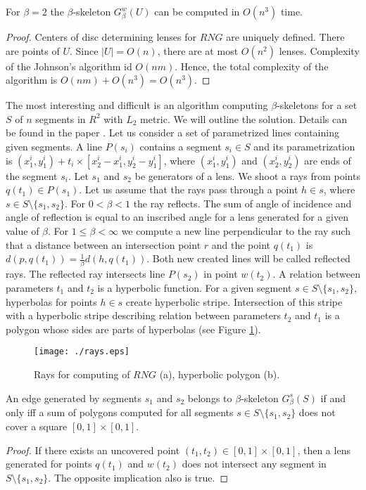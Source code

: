 \documentclass[11pt]{llncs}
\begin{document}
\begin{corollary}
For $\beta=2$ the $\beta$-skeleton $G_{\beta}^w(U)$ can be computed in $O(n^3)$ time.
\end{corollary}
\begin{proof}
Centers of disc determining lenses for $RNG$ are uniquely defined. There are points of $U$.
Since $|U|=O(n)$, there are at most $O(n^2)$ lenses. Complexity of the Johnson's algorithm
id $O(nm)$. Hence, the total complexity of the algorithm is $O(nm)+O(n^3)=O(n^3)$.   
\end{proof}


The most interesting and difficult is an algorithm computing $\beta$-skeletons for a set $S$
of $n$ segments in $R^2$ with $L_2$ metric. We will outline the solution. 
Details can be found in the paper \cite{km14}.
Let us consider a set of parametrized lines containing given segments. A line $P(s_i)$
contains a segment $s_i \in S$ and its parametrization is 
$(x_1^i,y_1^i)+t_i \times [x_2^i-x_1^i,y_2^i-y_1^i]$, where $(x_1^i,y_1^i)$ and $(x_2^i,y_2^i)$ are
ends of the segment $s_i$. Let $s_1$ and $s_2$ be generators of a lens.
We shoot a rays from points $q(t_1) \in P(s_1)$. Let us assume that the rays pass through
a point $h \in s$, where $s \in S \setminus \{s_1,s_2\}$.
For $0 < \beta < 1$ the ray reflects. The sum of angle of incidence and angle of reflection 
is equal to an inscribed angle for a lens generated for a given value of $\beta$.
For $1 \leq \beta < \infty$ we compute a new line perpendicular to the ray such that 
a distance between an intersection point $r$ and the point $q(t_1)$ is 
$d(p,q(t_1))=\frac{1}{\beta}d(h,q(t_1))$.
Both new created lines will be called reflected rays.
The reflected ray intersects line $P(s_2)$ in point $w(t_2)$.
A relation between parameters $t_1$ and $t_2$ is a hyperbolic function.
For a given segment $s \in S \setminus \{s_1,s_2\}$, hyperbolas for points $h \in s$
create hyperbolic stripe. Intersection of this stripe with a hyperbolic stripe describing relation
between parameters $t_2$ and $t_1$ is a polygon whose sides are parts of hyperbolas 
(see Figure \ref{fig:rays}). 

\begin{figure}[htbp]
\centering
\texttt{[image: ./rays.eps]}
\caption{Rays for computing of $RNG$ (a), hyperbolic polygon (b).}
\label{fig:rays}
\end{figure}   

\begin{theorem}
An edge generated by segments $s_1$ and $s_2$ belongs to $\beta$-skeleton $G_{\beta}^s(S)$
if and only iff a sum of polygons computed for all segments $s \in S \setminus \{s_1,s_2\}$
does not cover a square $[0,1] \times [0,1]$. 
\end{theorem}
\begin{proof}
If there exists an uncovered point $(t_1,t_2) \in [0,1] \times [0,1]$, then a lens generated 
for points $q(t_1)$ and $w(t_2)$ does not intersect any segment in $S \setminus \{s_1,s_2\}$.
The opposite implication also is true.
\end{proof}
\end{document}
